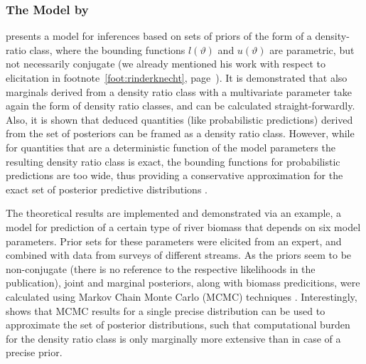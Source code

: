 \subsubsection{The Model by \texorpdfstring{\textcite{2011:rinderknecht:diss}}{Rinderknecht (2011)}}
\label{sec:alternatives:rinderknecht}

\textcite[\S 4]{2011:rinderknecht:diss} presents a model for inferences 
based on sets of priors of the form of a density-ratio class,
where the bounding functions $l(\vartheta)$ and $u(\vartheta)$ are parametric, but not necessarily conjugate
(we already mentioned his work with respect to elicitation in footnote~\ref{foot:rinderknecht}, page~\pageref{foot:rinderknecht}).
It is demonstrated that also marginals derived from a density ratio class with a multivariate parameter
take again the form of density ratio classes, and can be calculated straight-forwardly.
Also, it is shown that deduced quantities (like probabilistic predictions) derived from the set of posteriors
can be framed as a density ratio class.
However, while for quantities that are a deterministic function of the model parameters
the resulting density ratio class is exact, the bounding functions %
for probabilistic predictions are too wide, thus providing a conservative approximation for
the exact set of posterior predictive distributions \parencite[\S 4.2.4]{2011:rinderknecht:diss}.

The theoretical results are implemented and demonstrated via an example,
a model for prediction of a certain type of river biomass that depends on six model parameters.
Prior sets for these parameters were elicited from an expert,
and combined with data from surveys of different streams.
As the priors seem to be non-conjugate (there is no reference to the respective likelihoods in the publication),
joint and marginal posteriors, along with biomass predicitions, were calculated using
Markov Chain Monte Carlo (MCMC) techniques \parencite[see, e.g.,][]{1998:gilks}.
Interestingly, \textcite[\S 4.3]{2011:rinderknecht:diss} shows that
MCMC results for a single precise distribution can be used to approximate the set of posterior distributions,
such that computational burden for the density ratio class is only marginally more extensive than in case of a precise prior.

